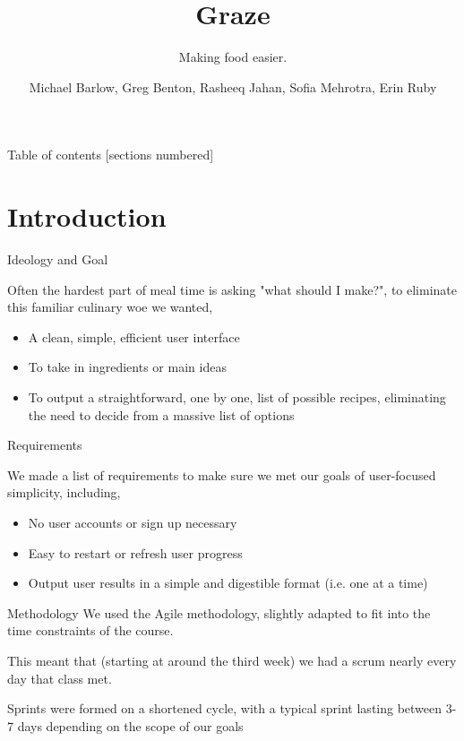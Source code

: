 \documentclass[10pt]{beamer}
\title{Graze}
\subtitle{Making food easier.}
\date{}
\author{Michael Barlow, Greg Benton, Rasheeq Jahan, Sofia Mehrotra, Erin Ruby}
\institute{University of Colorado}
\begin{document}
\maketitle

\begin{frame}{Table of contents}
  [sections numbered]
  \tableofcontents[hideallsubsections]
\end{frame}

\section{Introduction}

\begin{frame}[fragile]{Ideology and Goal}

    Often the hardest part of meal time is asking "what should I make?", to eliminate this familiar culinary woe we wanted,
    \begin{itemize}
    	\item A clean, simple, efficient user interface

        \item To take in ingredients or main ideas

        \item To output a straightforward, one by one, list of possible recipes, eliminating the need to decide from a massive list of options
    \end{itemize}



\end{frame}
\begin{frame}[fragile]{Requirements}

	We made a list of requirements to make sure we met our goals of user-focused simplicity, including,
    \begin{itemize}
    	\item No user accounts or sign up necessary
        \item Easy to restart or refresh user progress
        \item Output user results in a simple and digestible format (i.e. one at a time)
    \end{itemize}

\end{frame}

\begin{frame}[fragile]{Methodology}
	We used the Agile methodology, slightly adapted to fit into the time constraints of the course.

    This meant that (starting at around the third week) we had a scrum nearly every day that class met.

    Sprints were formed on a shortened cycle, with a typical sprint lasting between 3-7 days depending on the scope of our goals
\end{frame}
\end{document}
